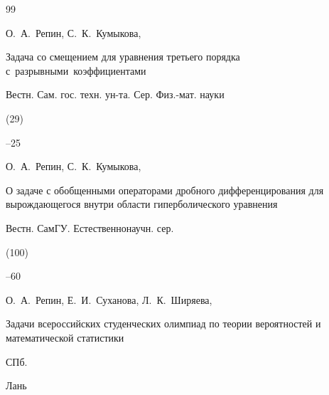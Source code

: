 \begin{thebibliography}{99}




\by О.~А.~Репин, С.~К.~Кумыкова,

\paper Задача со смещением для уравнения третьего порядка с~разрывными~коэффициентами

\jour Вестн. Сам. гос. техн. ун-та. Сер. Физ.-мат. науки


(29)

--25






\by О.~А.~Репин, С.~К.~Кумыкова,

\paper О задаче с обобщенными операторами дробного дифференцирования для вырождающегося внутри области гиперболического уравнения

\jour Вестн. СамГУ. Естественнонаучн. сер.


(100)

--60





\by О.~А.~Репин, Е.~И.~Суханова, Л.~К.~Ширяева,

\book Задачи всероссийских студенческих олимпиад по теории вероятностей и математической статистики

\publaddr СПб.

\publ Лань






























\end{thebibliography}













